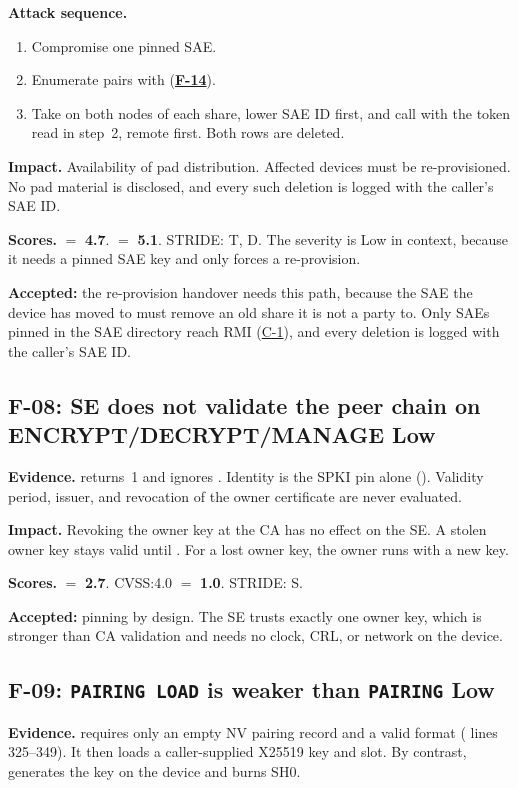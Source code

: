 \documentclass[11pt,a4paper]{article}
\newcommand{\sev}[1]{\textbf{#1}}
\newcommand{\fid}[1]{\textbf{#1}}
\begin{document}
\textbf{Attack sequence.}
\begin{enumerate}
\item Compromise one pinned SAE.
\item Enumerate pairs with  (\hyperref[f:F-14]{\fid{F-14}}).
\item Take  on both nodes of each share, lower SAE ID first, and call  with the token read in step~2, remote first. Both rows are deleted.
\end{enumerate}
\textbf{Impact.} Availability of pad distribution. Affected devices must be re-provisioned. No pad material is disclosed, and every such deletion is logged with the caller's SAE ID.

\textbf{Scores.}  $=$ \textbf{4.7}.  $=$ \textbf{5.1}. STRIDE: T, D. The severity is Low in context, because it needs a pinned SAE key and only forces a re-provision.

\textbf{Accepted:} the re-provision handover needs this path, because the SAE the device has moved to must remove an old share it is not a party to. Only SAEs pinned in the SAE directory reach RMI (\hyperref[c:C-1]{C-1}), and every deletion is logged with the caller's SAE ID.

\subsection*{F-08: SE does not validate the peer chain on ENCRYPT/DECRYPT/MANAGE \hfill \sev{Low}}\label{f:F-08}
\textbf{Evidence.}  returns~1 and ignores . Identity is the SPKI pin alone (). Validity period, issuer, and revocation of the owner certificate are never evaluated.

\textbf{Impact.} Revoking the owner key at the CA has no effect on the SE. A stolen owner key stays valid until . For a lost owner key, the owner runs  with a new key.

\textbf{Scores.}  $=$ \textbf{2.7}. CVSS:4.0 $=$ \textbf{1.0}. STRIDE: S.

\textbf{Accepted:} pinning by design. The SE trusts exactly one owner key, which is stronger than CA validation and needs no clock, CRL, or network on the device.

\subsection*{F-09: \texttt{PAIRING LOAD} is weaker than \texttt{PAIRING} \hfill \sev{Low}}\label{f:F-09}
\textbf{Evidence.}  requires only an empty NV pairing record and a valid format ( lines 325--349). It then loads a caller-supplied X25519 key and slot. By contrast,  generates the key on the device and burns SH0.
\end{document}
